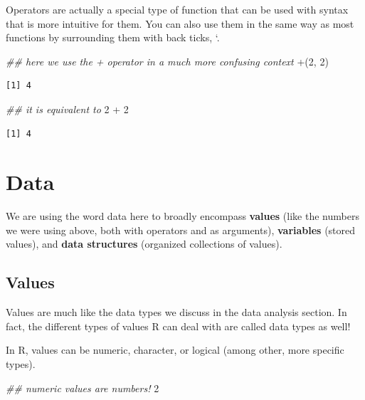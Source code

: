 \documentclass[
  letterpaper,
  DIV=11,
  numbers=noendperiod]{scrreprt}
\newenvironment{Shaded}{\begin{snugshade}}{\end{snugshade}}
\newcommand{\AttributeTok}[1]{\textcolor[rgb]{0.40,0.45,0.13}{#1}}
\newcommand{\DecValTok}[1]{\textcolor[rgb]{0.68,0.00,0.00}{#1}}
\newcommand{\DocumentationTok}[1]{\textcolor[rgb]{0.37,0.37,0.37}{\textit{#1}}}
\newcommand{\NormalTok}[1]{\textcolor[rgb]{0.00,0.23,0.31}{#1}}
\newcommand{\SpecialCharTok}[1]{\textcolor[rgb]{0.37,0.37,0.37}{#1}}
\newcommand{\StringTok}[1]{\textcolor[rgb]{0.13,0.47,0.30}{#1}}
\begin{document}
Operators are actually a special type of function that can be used with
syntax that is more intuitive for them. You can also use them in the
same way as most functions by surrounding them with back ticks, `.

\begin{Shaded}
\begin{Highlighting}[]
\DocumentationTok{\#\# here we use the + operator in a much more confusing context}
\StringTok{\textasciigrave{}}\AttributeTok{+}\StringTok{\textasciigrave{}}\NormalTok{(}\DecValTok{2}\NormalTok{, }\DecValTok{2}\NormalTok{)}
\end{Highlighting}
\end{Shaded}

\begin{verbatim}
[1] 4
\end{verbatim}

\begin{Shaded}
\begin{Highlighting}[]
\DocumentationTok{\#\# it is equivalent to}
\DecValTok{2} \SpecialCharTok{+} \DecValTok{2}
\end{Highlighting}
\end{Shaded}

\begin{verbatim}
[1] 4
\end{verbatim}

\section{Data}\label{data}

We are using the word data here to broadly encompass \textbf{values}
(like the numbers we were using above, both with operators and as
arguments), \textbf{variables} (stored values), and \textbf{data
structures} (organized collections of values).

\subsection{Values}\label{values}

Values are much like the data types we discuss in the data analysis
section. In fact, the different types of values R can deal with are
called data types as well!

In R, values can be numeric, character, or logical (among other, more
specific types).

\begin{Shaded}
\begin{Highlighting}[]
\DocumentationTok{\#\# numeric values are numbers!}
\DecValTok{2}
\end{Highlighting}
\end{Shaded}
\end{document}
